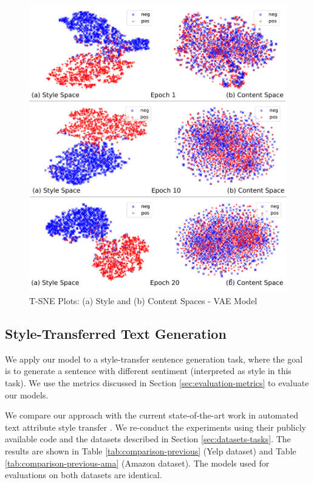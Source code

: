 \begin{figure}[ht]
	\includegraphics[width=\linewidth]{images/latent-spaces-vae}
	\caption{T-SNE Plots: (a) Style and (b) Content Spaces - VAE Model}
	\label{fig:vae-tsne}
\end{figure}

\subsection{Style-Transferred Text Generation}

We apply our model to a style-transfer sentence generation task, where the goal is to generate a sentence with different sentiment (interpreted as style in this task). We use the metrics discussed in Section \ref{sec:evaluation-metrics} to evaluate our models.

We compare our approach with the current state-of-the-art work in automated text attribute style transfer \citep{shen2017style,fu2017style}. We re-conduct the experiments using their publicly available code and the datasets described in Section \ref{sec:datasets-tasks}. The results are shown in Table \ref{tab:comparison-previous} (Yelp dataset) and Table \ref{tab:comparison-previous-ama} (Amazon dataset). The models used for evaluations on both datasets are identical.

